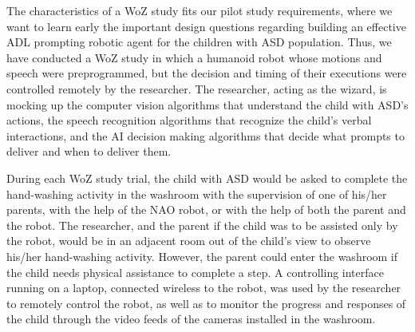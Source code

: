 The characteristics of a WoZ study fits our pilot study requirements, where we want to learn early the important design questions regarding building an effective ADL prompting robotic agent for the children with ASD population.  Thus, we have conducted a WoZ study in which a humanoid robot whose motions and speech were preprogrammed, but the decision and timing of their executions were controlled remotely by the researcher.  The researcher, acting as the wizard, is mocking up the computer vision algorithms that understand the child with ASD's actions, the speech recognition algorithms that recognize the child's verbal interactions, and the AI decision making algorithms that decide what prompts to deliver and when to deliver them.

During each WoZ study trial, the child with ASD would be asked to complete the hand-washing activity in the washroom with the supervision of one of his/her parents, with the help of the NAO robot, or with the help of both the parent and the robot. The researcher, and the parent if the child was to be assisted only by the robot, would be in an adjacent room out of the child's view to observe his/her hand-washing activity.  However, the parent could enter the washroom if the child needs physical assistance to complete a step. A controlling interface running on a laptop, connected wireless to the robot, was used by the researcher to remotely control the robot, as well as to monitor the progress and responses of the child through the video feeds of the cameras installed in the washroom.

